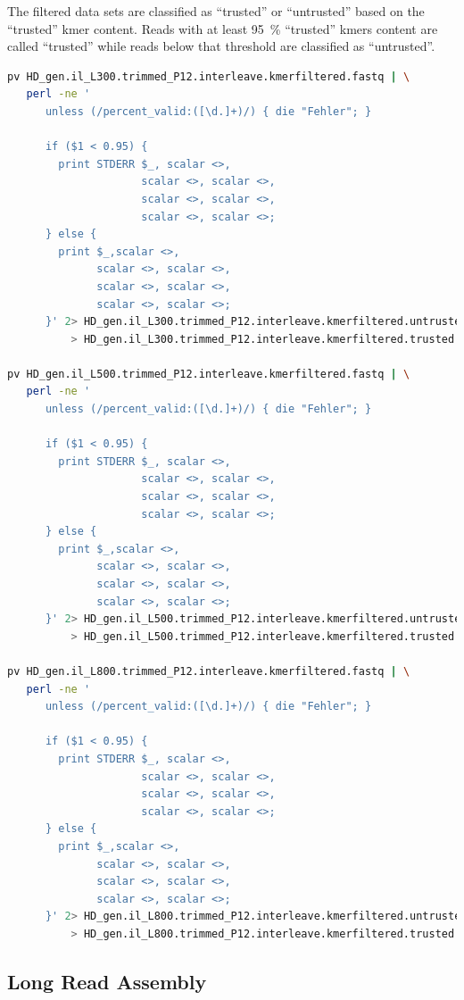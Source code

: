 \documentclass[12pt,a4paper]{scrartcl}
\begin{document}
The filtered data sets are classified as ``trusted'' or ``untrusted''
based on the ``trusted'' kmer content. Reads with at least
\SI{95}{\percent} ``trusted'' kmers content are called ``trusted''
while reads below that threshold are classified as ``untrusted''.

\begin{lstlisting}[language=bash]
pv HD_gen.il_L300.trimmed_P12.interleave.kmerfiltered.fastq | \
   perl -ne '
      unless (/percent_valid:([\d.]+)/) { die "Fehler"; }

      if ($1 < 0.95) {
        print STDERR $_, scalar <>,
                     scalar <>, scalar <>,
                     scalar <>, scalar <>,
                     scalar <>, scalar <>;
      } else {
        print $_,scalar <>,
              scalar <>, scalar <>,
              scalar <>, scalar <>,
              scalar <>, scalar <>;
      }' 2> HD_gen.il_L300.trimmed_P12.interleave.kmerfiltered.untrusted.fastq \
          > HD_gen.il_L300.trimmed_P12.interleave.kmerfiltered.trusted.fastq

pv HD_gen.il_L500.trimmed_P12.interleave.kmerfiltered.fastq | \
   perl -ne '
      unless (/percent_valid:([\d.]+)/) { die "Fehler"; }

      if ($1 < 0.95) {
        print STDERR $_, scalar <>,
                     scalar <>, scalar <>,
                     scalar <>, scalar <>,
                     scalar <>, scalar <>;
      } else {
        print $_,scalar <>,
              scalar <>, scalar <>,
              scalar <>, scalar <>,
              scalar <>, scalar <>;
      }' 2> HD_gen.il_L500.trimmed_P12.interleave.kmerfiltered.untrusted.fastq \
          > HD_gen.il_L500.trimmed_P12.interleave.kmerfiltered.trusted.fastq

pv HD_gen.il_L800.trimmed_P12.interleave.kmerfiltered.fastq | \
   perl -ne '
      unless (/percent_valid:([\d.]+)/) { die "Fehler"; }

      if ($1 < 0.95) {
        print STDERR $_, scalar <>,
                     scalar <>, scalar <>,
                     scalar <>, scalar <>,
                     scalar <>, scalar <>;
      } else {
        print $_,scalar <>,
              scalar <>, scalar <>,
              scalar <>, scalar <>,
              scalar <>, scalar <>;
      }' 2> HD_gen.il_L800.trimmed_P12.interleave.kmerfiltered.untrusted.fastq \
          > HD_gen.il_L800.trimmed_P12.interleave.kmerfiltered.trusted.fastq
\end{lstlisting}

\subsection*{Long Read Assembly}
\end{document}
